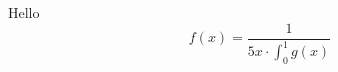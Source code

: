 \documentclass{article}
\begin{document}
Hello
\begin{equation}
  f(x) = \frac{1}{5x\cdot \int_0^1 g(x)}
\end{equation}
\end{document}

